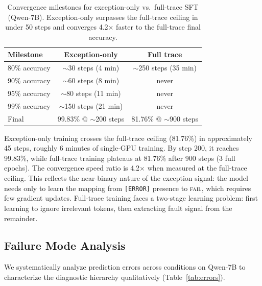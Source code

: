 \documentclass[11pt,a4paper]{article}
\begin{document}
\begin{table}[t]
\centering
\small
\begin{tabular}{lcc}
\toprule
\textbf{Milestone} & \textbf{Exception-only} & \textbf{Full trace} \\
\midrule
80\% accuracy & $\sim$30 steps (4 min) & $\sim$250 steps (35 min) \\
90\% accuracy & $\sim$60 steps (8 min) & never \\
95\% accuracy & $\sim$80 steps (11 min) & never \\
99\% accuracy & $\sim$150 steps (21 min) & never \\
Final & 99.83\% @ $\sim$200 steps & 81.76\% @ $\sim$900 steps \\
\bottomrule
\end{tabular}
\caption{Convergence milestones for exception-only vs.\ full-trace SFT (Qwen-7B). Exception-only surpasses the full-trace ceiling in under 50 steps and converges 4.2$\times$ faster to the full-trace final accuracy.}
\label{tab:dynamics}
\end{table}

Exception-only training crosses the full-trace ceiling (81.76\%) in approximately 45 steps, roughly 6 minutes of single-GPU training. By step 200, it reaches 99.83\%, while full-trace training plateaus at 81.76\% after 900 steps (3 full epochs). The convergence speed ratio is 4.2$\times$ when measured at the full-trace ceiling. This reflects the near-binary nature of the exception signal: the model needs only to learn the mapping from \texttt{[ERROR]} presence to \textsc{fail}, which requires few gradient updates. Full-trace training faces a two-stage learning problem: first learning to ignore irrelevant tokens, then extracting fault signal from the remainder.

\subsection{Failure Mode Analysis}
\label{sec:error_analysis}

We systematically analyze prediction errors across conditions on Qwen-7B to characterize the diagnostic hierarchy qualitatively (Table~\ref{tab:errors}).
\end{document}
